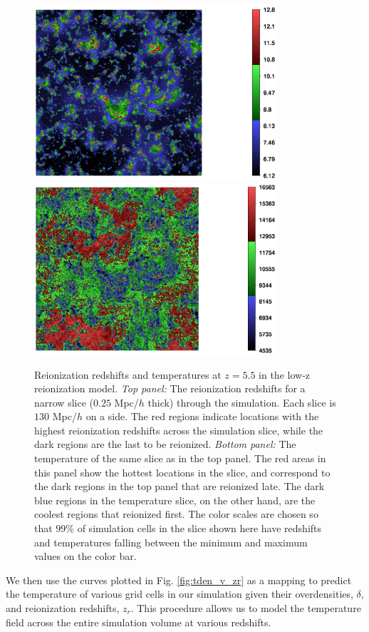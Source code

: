 \begin{figure}[t]
\bc
\includegraphics[width=9cm]{f3a.ps}
\includegraphics[width=9cm]{f3b.ps}
\caption{Reionization redshifts and temperatures at $z=5.5$ in the low-z reionization model.
{\em Top panel:} The reionization redshifts for a narrow slice ($0.25$ Mpc/$h$ thick) through
the simulation. Each slice is $130$ Mpc/$h$ on a side. The red regions indicate locations with the highest reionization redshifts across
the simulation slice, while the dark regions are the last to be reionized. {\em Bottom panel:}
The temperature of the same slice as in the top panel. The red areas in this panel show the
hottest locations in the slice, and correspond to the dark regions in the top panel that
are reionized late. The dark blue regions in the temperature slice, on the other hand, are the coolest regions that reionized
first. The color scales are chosen so that $99\%$ of simulation cells in the slice shown here have redshifts and temperatures falling 
between the minimum and maximum values on the color bar.}
\label{fig:tslice_lowz}
\ec
\end{figure}

We then use the curves plotted in Fig. \ref{fig:tden_v_zr} as a mapping to predict the temperature of various grid cells in our
simulation given their overdensities, $\delta$, and reionization redshifts, $z_r$. This procedure allows us to model the temperature
field across the entire simulation volume at various redshifts. 


